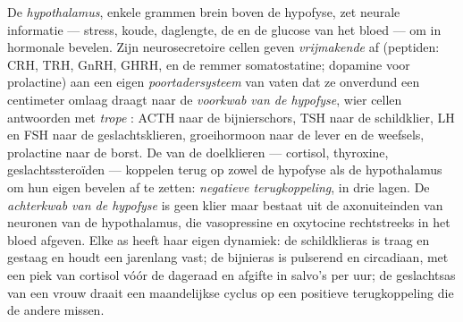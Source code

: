 \begin{definition}[De assen]\label{def:b3:endocrinology:axes}
De \emph{hypothalamus}, enkele grammen brein boven de hypofyse, zet
neurale informatie --- stress, koude, daglengte, de  en de
glucose van het bloed --- om in hormonale bevelen. Zijn
neurosecretoire cellen geven \emph{vrijmakende } af (peptiden:
CRH, TRH, GnRH, GHRH, en de remmer somatostatine; dopamine voor
prolactine) aan een eigen \emph{poortadersysteem} van vaten dat ze
onverdund een centimeter omlaag draagt naar de \emph{voorkwab van de
hypofyse}, wier cellen antwoorden met \emph{trope }: ACTH naar
de bijnierschors, TSH naar de schildklier, LH en FSH naar de
geslachtsklieren, groeihormoon naar de lever en de weefsels,
prolactine naar de borst. De  van de doelklieren --- cortisol,
thyroxine, geslachtssteroïden --- koppelen terug op zowel de hypofyse
als de hypothalamus om hun eigen bevelen af te zetten:
\emph{negatieve terugkoppeling}, in drie lagen. De \emph{achterkwab van
de hypofyse} is geen klier maar bestaat uit de axonuiteinden van
neuronen van de hypothalamus, die vasopressine en oxytocine
rechtstreeks in het bloed afgeven. Elke as heeft haar eigen dynamiek:
de schildklieras is traag en gestaag en houdt een  jarenlang
vast; de bijnieras is pulserend en circadiaan, met een piek van
cortisol vóór de dageraad en afgifte in salvo's per uur; de
geslachtsas van een vrouw draait een maandelijkse cyclus op een
positieve terugkoppeling die de andere missen.
\end{definition}


